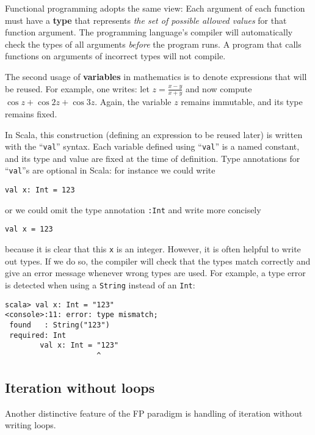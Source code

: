 Functional programming adopts the same view: Each argument of each
function must have a \textbf{type} that represents \emph{the
set of possible allowed values} for that function argument. The programming
language's compiler will automatically check the types of all arguments
\emph{before} the program runs. A program that calls functions on
arguments of incorrect types will not compile.

The second usage of \textbf{variables} in mathematics
is to denote expressions that will be reused. For example, one writes:
let $z=\frac{x-y}{x+y}$ and now compute $\cos z+\cos2z+\cos3z$.
Again, the variable $z$ remains immutable, and its type remains fixed.

In Scala, this construction (defining an expression to be reused later)
is written with the ``\lstinline!val!'' syntax. Each variable defined
using ``\lstinline!val!'' is a named constant, and its type and
value are fixed at the time of definition. Type annotations for ``\lstinline!val!''s
are optional in Scala: for instance we could write 
\begin{lstlisting}
val x: Int = 123
\end{lstlisting}
or we could omit the type annotation \lstinline!:Int! and write more
concisely
\begin{lstlisting}
val x = 123
\end{lstlisting}
because it is clear that this \texttt{}\lstinline!x! is an integer.
However, it is often helpful to write out types. If we do so, the
compiler will check that the types match correctly and give an error
message whenever wrong types are used. For example, a type error is
detected when using a \lstinline!String! instead of an \lstinline!Int!:
\begin{lstlisting}
scala> val x: Int = "123"
<console>:11: error: type mismatch;
 found   : String("123")
 required: Int
        val x: Int = "123"
                     ^
\end{lstlisting}


\subsection{Iteration without loops}

Another distinctive feature of the FP paradigm is handling of iteration
without writing loops.

